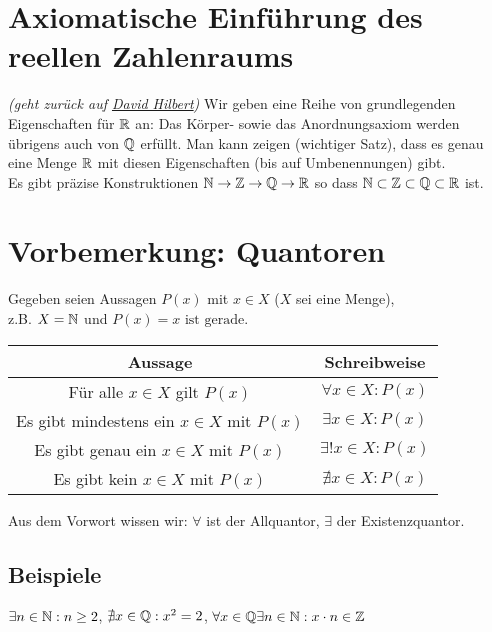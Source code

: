 \section*{Axiomatische Einführung des reellen Zahlenraums}\label{AxiomeReelleZahlen}
\emph{(geht zurück auf \href{https://de.wikipedia.org/wiki/David_Hilbert}{David Hilbert})}\nl
Wir geben eine Reihe von grundlegenden Eigenschaften für $\mathbb{R}$ an:
Das Körper- sowie das Anordnungsaxiom werden übrigens auch von $\mathbb{Q}$ erfüllt.\nl
Man kann zeigen (wichtiger Satz), dass es genau eine Menge $\mathbb{R}$ mit diesen Eigenschaften (bis auf Umbenennungen) gibt.\\
Es gibt präzise Konstruktionen $\mathbb{N} \rightarrow \mathbb{Z} \rightarrow \mathbb{Q} \rightarrow \mathbb{R}$ so dass $\mathbb{N} \subset \mathbb{Z} \subset \mathbb{Q} \subset \mathbb{R}$ ist.

\section{Vorbemerkung: Quantoren}\label{3.1}
Gegeben seien Aussagen $P(x)$ mit $x \in X$ ($X$ sei eine Menge),\\
z.B. $X=\mathbb{N}$ und $P(x)=x \text{ ist gerade}$.\nl
\begin{tabular}{c|c}
Aussage & Schreibweise \\ 
\hline 
Für alle $x \in X$ gilt $P(x)$ & $\forall x \in X : P(x)$\\
Es gibt mindestens ein $x \in X$ mit $P(x)$ & $\exists x \in X : P(x)$\\
Es gibt genau ein $x \in X$ mit $P(x)$ & $\exists! x \in X : P(x)$\\
Es gibt kein $x \in X$ mit $P(x)$ & $\nexists x \in X : P(x)$
\end{tabular}\nl
Aus dem Vorwort wissen wir: $\forall$ ist der Allquantor, $\exists$ der Existenzquantor.

\subsection*{Beispiele}
$\exists n \in \mathbb{N} : n \ge 2$, $\nexists x \in \mathbb{Q} : x^2 = 2$, $\forall x \in \mathbb{Q} \exists n \in \mathbb{N} : x \cdot n \in \mathbb{Z}$

\newpage

{}
